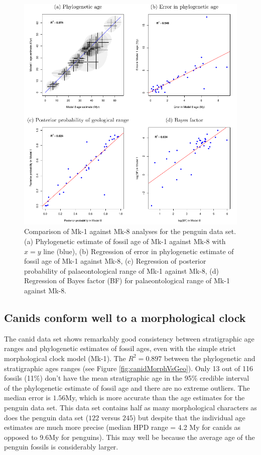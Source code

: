 \documentclass[11pt]{article}
\newcommand{\Mstrict}{{Mk-1}}
\newcommand{\Mrelaxed}{{Mk-8}}
\newcommand{\ncanidfossils}{{116}}
\begin{document}
\begin{figure}
\includegraphics{Figure_comparison.pdf}
\caption{\label{fig:compareM1M8}
Comparison of \Mstrict{} against \Mrelaxed{} analyses for the penguin data set. (a) Phylogenetic estimate of fossil age of \Mstrict{} against \Mrelaxed{} with $x=y$ line (blue), (b) Regression of error in phylogenetic estimate of fossil age of \Mstrict{} against \Mrelaxed{}, (c) Regression of posterior probability of palaeontological range of \Mstrict{} against \Mrelaxed{}, (d) Regression of Bayes factor (BF) for palaeontological range of \Mstrict{} against \Mrelaxed{}.}
\end{figure}





\subsection*{Canids conform well to a morphological clock}

The canid data set shows remarkably good consistency between stratigraphic age ranges and phylogenetic estimates of fossil ages, even with the simple strict morphological clock model (\Mstrict{}).
The $R^2 = 0.897$ between the phylogenetic and stratigraphic ages ranges (see Figure \ref{fig:canidMorphVsGeo}). 
Only 13 out of \ncanidfossils{} fossils (11\%) don't have the mean stratigraphic age in the 95\% credible interval of the phylogenetic estimate of fossil age and there are no extreme outliers. 
The median error is $1.56$My, which is more accurate than the age estimates for the penguin data set.
This data set contains half as many morphological characters as does the penguin data set ($122$ versus $245$) but despite that the individual age estimates are much more precise (median HPD range = 4.2 My for canids as opposed to 9.6My for penguins). This may well be because the average age of the penguin fossils is considerably larger.
\end{document}

